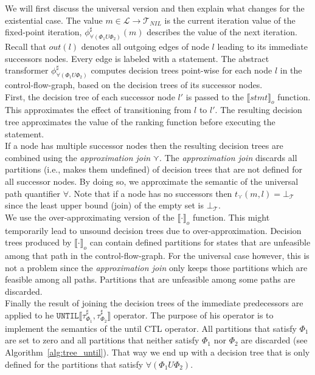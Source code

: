 \documentclass[11pt,a4paper,titlepage]{article}
\theoremstyle{definition}
\begin{document}
We will first discuss the universal version and then explain what changes for the existential case.
The value $m \in \mathcal{L} \rightarrow \mathcal{T}_{NIL}$ is the current iteration value of the fixed-point iteration, 
$\phi^\sharp_{\forall(\Phi_1 U \Phi_2)}(m)$ describes the value of the next iteration.
Recall that $out(l)$ denotes all outgoing edges of node $l$ leading to its immediate successors nodes. Every edge is labeled with a statement. 
The abstract transformer $\phi^\sharp_{\forall(\Phi_1 U \Phi_2)}$ computes decision trees point-wise for each node $l$ in the 
control-flow-graph, based on the decision trees of its successor nodes.\\

First, the decision tree of each successor node $l'$ is passed to the ${\llbracket stmt \rrbracket}_{o}$ function. 
This approximates the effect of transitioning from $l$ to $l'$. The resulting decision tree approximates the value of 
the ranking function before executing the statement.\\

If a node has multiple successor nodes then the resulting decision trees 
are combined using the \textit{approximation join} $\curlyvee$. 
The \textit{approximation join} discards all partitions (i.e., makes them undefined)
of decision trees that are not defined for all successor nodes. By doing so, we approximate the semantic of the universal path  
quantifier $\forall$. Note that if a node has no successors then $t_{\curlyvee}(m, l) = \bot_{\mathcal{T}}$ since
the least upper bound (join) of the empty set is $\bot_\mathcal{T}$.\\

We use the over-approximating version of the ${\llbracket \cdot \rrbracket}_{o}$ function. 
This might temporarily lead to unsound decision trees due to over-approximation. 
Decision trees produced by ${\llbracket \cdot \rrbracket}_{o}$ can contain defined partitions for states that are unfeasible 
among that path in the control-flow-graph. For the universal case however, this is not a problem since the 
\textit{approximation join} only keeps those partitions which are feasible among all paths. 
Partitions that are unfeasible among some paths are discarded.\\

Finally the result of joining the decision trees of the immediate predecessors are 
applied to he $\mathtt{UNTIL}\llbracket \tau^\sharp_{\Phi_1}, \tau^\sharp_{\Phi_2} \rrbracket $ operator. 
The purpose of his operator is to implement the semantics of the \textsf{until} CTL operator. 
All partitions that satisfy $\Phi_1$ are set to zero and all partitions that neither 
satisfy $\Phi_1$ nor $\Phi_2$ are discarded (see Algorithm~\ref{alg:tree_until}).
That way we end up with a decision tree that is only defined for the partitions that satisfy $\forall(\Phi_1 U \Phi_2)$.\\
\end{document}
